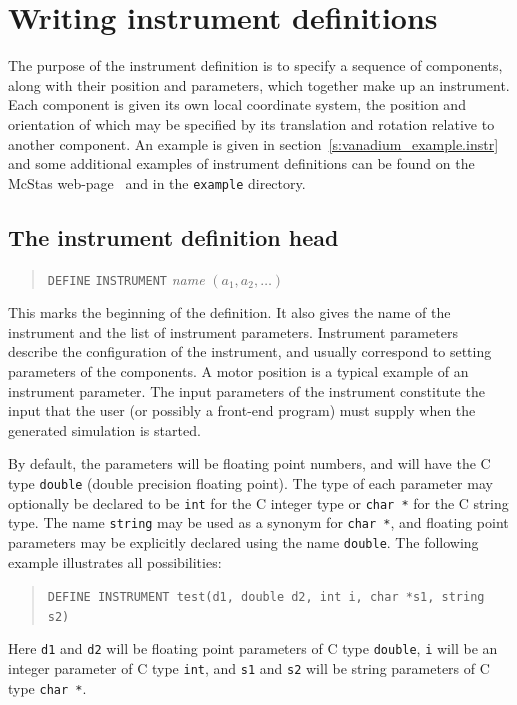 {\section{Writing instrument definitions}
\label{s:instrdefs}

The purpose of the instrument definition is to specify a sequence of
components, along with their position and parameters, which together
make up an instrument. Each component is given its own local coordinate
system, the position and orientation of which may be specified by its
translation and rotation relative to another component. An example is
given in section~\ref{s:vanadium_example.instr} and some additional
examples of instrument definitions can be found on the McStas
web-page~\cite{mcstas_webpage} and in the \texttt{example} directory.



\subsection{The instrument definition head}

\begin{quote}
  \texttt{DEFINE} \texttt{INSTRUMENT} \textit{name} $(a_1, a_2, \ldots)$
\end{quote} 
This marks the beginning of the definition. It also gives the name of
the instrument and the list of instrument parameters. Instrument
parameters describe the configuration of the instrument, and usually
correspond to setting parameters of the components. A motor position is
a typical example of an instrument parameter. The input parameters of
the instrument constitute the input that the user (or possibly a
front-end program) must supply when the
generated simulation is started.

By default, the parameters will be floating point numbers, and will have
the C type \verb+double+ (double precision floating point). The type of
each parameter may optionally be declared to be \verb+int+ for the C
integer type or \verb+char *+ for the C string type. The name
\verb+string+ may be used as a synonym for \verb+char *+, and floating
point parameters may be explicitly declared using the name
\verb+double+. The following example illustrates all possibilities:
\begin{quote}
  \texttt{DEFINE INSTRUMENT test(d1, double d2, int i, char *s1, string s2)}
\end{quote}
Here \verb+d1+ and \verb+d2+ will be floating point parameters of C type
\verb+double+, \verb+i+ will be an integer parameter of C type
\verb+int+, and \verb+s1+ and \verb+s2+ will be string parameters of C
type \verb+char *+.


}
